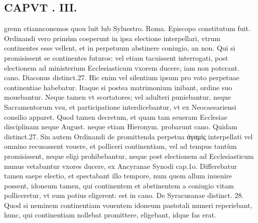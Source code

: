 \documentclass{article}
\begin{document}
\begin{pages}
\section*{CAPVT . III. }
\marginpar{[ p.113 ]}\pstart grenn etiannconemos quou luit lub Syluestro. Roma. Episcopo constitutum fuit.  \pend\pstart Ordinandi vero primùm coeperunt in ipsa electione interpellari, vtrum continentes esse vellent, et in perpetuum abstinere coniugio, an non. Qui si promisissent se continentes futuros: vel etiam tacuissent interrogati, post electionem ad ministerium Ecclesiasticum vxorem ducere, iam non poterant. cano. Diaconus distinct.27. Hic enim vel silentium ipsum pro voto perpetuae continentiae habebatur. Itaque  si postea matrimonium inibant, ordine suo mouebantur. Neque tamen vt scortatores; vel adulteri puniebantur, neque Sacramentorum vsu, et participatione interdicebantur, vt ex Neocaesariensi consilio apparet. Quod tamen decretum, et quam tam seueram Ecclesiae disciplinam neque August. neque etiam Hieronym. probarunt cano. Quidam distinct.27. Sin autem Ordinandi de promittenda perpetua ἀγαμίς interpellati vel omnino recusassent vouere, et polliceri continentiam, vel ad tempus tantùm promisissent, neque eligi prohibebantur, neque post electionem ad Ecclesiasticum munus vetabantur vxores ducere, ex Ancyranae Synodi cap.1o. Differebatur tamen saepe electio, et spectabant illo tempore, num quem allum inuenire possent, idoneum tamen, qui continentem et abstinentem a coniugio vitam polliceretur, vt eum potius eligerent: est in cano. De Syracusanae distinct. 28. Quod si neminem continentiam vouentem idoneum pastotali muneri reperiebant, hunc, qui continentiam nollebat promittere, eligebant, idque fas erat.  \pend

\end{pages}
\end{document}
